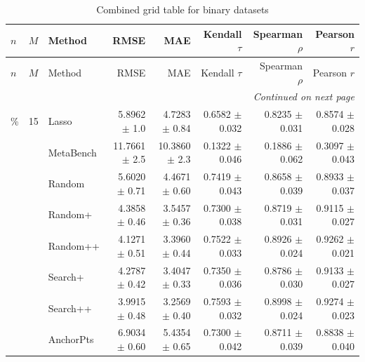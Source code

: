 \footnotesize
\setlength{\tabcolsep}{2pt}
\renewcommand{\arraystretch}{1.05}
\setlength{\LTpre}{0pt}
\setlength{\LTpost}{0pt}
\setlength{\LTleft}{\fill}
\setlength{\LTright}{\fill}
\begin{longtable}{llp{}rrrrr}
\caption{Combined grid table for binary datasets}\label{tab:combined_grid_binary}\\
\toprule
$n$ & $M$ & Method & RMSE & MAE & Kendall $\tau$ & Spearman $\rho$ & Pearson $r$ \\
\midrule
\endfirsthead
\toprule
$n$ & $M$ & Method & RMSE & MAE & Kendall $\tau$ & Spearman $\rho$ & Pearson $r$ \\
\midrule
\endhead
\midrule
\multicolumn{8}{r}{\emph{Continued on next page}} \\
\midrule
\endfoot
\bottomrule
\endlastfoot
5\% & 15 & Lasso & 5.8962 {\scriptsize $\pm$ 1.0} & 4.7283 {\scriptsize $\pm$ 0.84} & 0.6582 {\scriptsize $\pm$ 0.032} & 0.8235 {\scriptsize $\pm$ 0.031} & 0.8574 {\scriptsize $\pm$ 0.028} \\
 &  & MetaBench & 11.7661 {\scriptsize $\pm$ 2.5} & 10.3860 {\scriptsize $\pm$ 2.3} & 0.1322 {\scriptsize $\pm$ 0.046} & 0.1886 {\scriptsize $\pm$ 0.062} & 0.3097 {\scriptsize $\pm$ 0.043} \\
 &  & Random & 5.6020 {\scriptsize $\pm$ 0.71} & 4.4671 {\scriptsize $\pm$ 0.60} & 0.7419 {\scriptsize $\pm$ 0.043} & 0.8658 {\scriptsize $\pm$ 0.039} & 0.8933 {\scriptsize $\pm$ 0.037} \\
 &  & Random+ & 4.3858 {\scriptsize $\pm$ 0.46} & 3.5457 {\scriptsize $\pm$ 0.36} & 0.7300 {\scriptsize $\pm$ 0.038} & 0.8719 {\scriptsize $\pm$ 0.031} & 0.9115 {\scriptsize $\pm$ 0.027} \\
 &  & Random++ & 4.1271 {\scriptsize $\pm$ 0.51} & 3.3960 {\scriptsize $\pm$ 0.44} & 0.7522 {\scriptsize $\pm$ 0.033} & 0.8926 {\scriptsize $\pm$ 0.024} & 0.9262 {\scriptsize $\pm$ 0.021} \\
 &  & Search+ & 4.2787 {\scriptsize $\pm$ 0.42} & 3.4047 {\scriptsize $\pm$ 0.33} & 0.7350 {\scriptsize $\pm$ 0.036} & 0.8786 {\scriptsize $\pm$ 0.030} & 0.9133 {\scriptsize $\pm$ 0.027} \\
 &  & Search++ & 3.9915 {\scriptsize $\pm$ 0.48} & 3.2569 {\scriptsize $\pm$ 0.40} & 0.7593 {\scriptsize $\pm$ 0.032} & 0.8998 {\scriptsize $\pm$ 0.024} & 0.9274 {\scriptsize $\pm$ 0.023} \\
 &  & AnchorPts & 6.9034 {\scriptsize $\pm$ 0.60} & 5.4354 {\scriptsize $\pm$ 0.65} & 0.7300 {\scriptsize $\pm$ 0.042} & 0.8711 {\scriptsize $\pm$ 0.039} & 0.8838 {\scriptsize $\pm$ 0.040} \\

\end{longtable}
